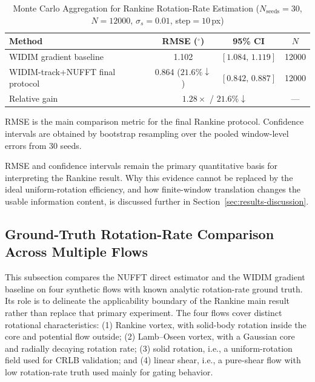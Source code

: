 \documentclass[lettersize,journal]{IEEEtran}
\begin{document}
\begin{table}[!htbp]
  \renewcommand{\arraystretch}{1.2}
  \caption{Monte Carlo Aggregation for Rankine Rotation-Rate Estimation
    ($N_{\mathrm{seeds}}=30$, $N=12000$, $\sigma_s=0.01$, step$=10$\,px)}
  \label{tab:mc_rotation}
  \centering
  \begin{threeparttable}
    \begin{tabular}{lccc}
      \toprule
      Method & RMSE ($^\circ$) & 95\% CI & $N$ \\
      \midrule
      WIDIM gradient baseline & 1.102 & $[1.084,\,1.119]$ & 12000 \\
      WIDIM-track+NUFFT final protocol & 0.864 ($21.6\%\downarrow$) & $[0.842,\,0.887]$ & 12000 \\
      \midrule
      Relative gain & \multicolumn{2}{c}{$1.28\times$ / $21.6\%\downarrow$} & --- \\
      \bottomrule
    \end{tabular}
    \begin{tablenotes}
      \footnotesize
      \item RMSE is the main comparison metric for the final Rankine protocol.
            Confidence intervals are obtained by bootstrap resampling over the pooled
            window-level errors from 30 seeds.
    \end{tablenotes}
  \end{threeparttable}
\end{table}

RMSE and confidence intervals remain the primary quantitative basis for interpreting the Rankine result.
Why this evidence cannot be replaced by the ideal uniform-rotation efficiency,
and how finite-window translation changes the usable information content,
is discussed further in Section~\ref{sec:results-discussion}.

\subsection{Ground-Truth Rotation-Rate Comparison Across Multiple Flows}
\label{sec:exp_gt_vorticity}

This subsection compares the NUFFT direct estimator and the WIDIM gradient baseline on four synthetic flows with known analytic rotation-rate ground truth.
Its role is to delineate the applicability boundary of the Rankine main result rather than replace that primary experiment.
The four flows cover distinct rotational characteristics:
(1) Rankine vortex, with solid-body rotation inside the core and potential flow outside;
(2) Lamb--Oseen vortex, with a Gaussian core and radially decaying rotation rate;
(3) solid rotation, i.e., a uniform-rotation field used for CRLB validation;
and (4) linear shear, i.e., a pure-shear flow with low rotation-rate truth used mainly for gating behavior.
\end{document}
